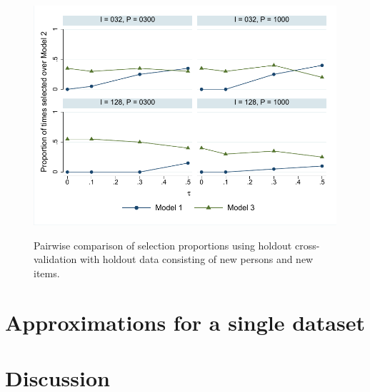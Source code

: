 \documentclass[12pt, letterpaper]{article}
\begin{document}
\begin{figure}[htbp]
	\centering
	\includegraphics[height=3.5in, trim = 1mm 1mm 1mm 1mm, clip=true]
		{chapter_2/figs/both_line.pdf}
	\caption{Pairwise comparison of selection proportions using holdout cross-validation with holdout data consisting of new persons and new items.}
	\label{fig:both-line}
\end{figure}


\section{Approximations for a single dataset}


\section{Discussion}



%
%
\end{document}
